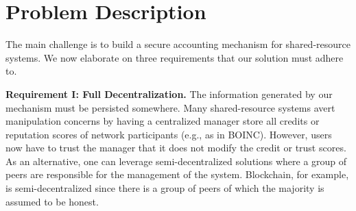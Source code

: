 



\section{Problem Description}
\label{sec:problem_description}
The main challenge is to build a secure accounting mechanism for shared-resource systems.
We now elaborate on three requirements that our solution must adhere to.

\textbf{Requirement I: Full Decentralization.}
The information generated by our mechanism must be persisted somewhere.
Many shared-resource systems avert manipulation concerns by having a centralized manager store all credits or reputation scores of network participants (e.g., as in BOINC).
However, users now have to trust the manager that it does not modify the credit or trust scores.
As an alternative, one can leverage semi-decentralized solutions where a group of peers are responsible for the management of the system.
Blockchain, for example, is semi-decentralized since there is a group of peers of which the majority is assumed to be honest.

